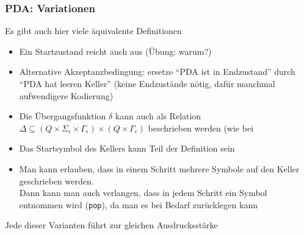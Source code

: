 \documentclass[aspectratio=1610,onlymath]{beamer}
\begin{document}
\begin{frame}\frametitle{PDA: Variationen}

Es gibt auch hier viele äquivalente Definitionen\pause
\begin{itemize}
\item Ein Startzustand reicht auch aus (Übung: warum?)\pause
\item Alternative Akzeptanzbedingung: ersetze "`PDA ist in Endzustand"' durch "`PDA hat leeren Keller"'
(keine Endzustände nötig, dafür manchmal aufwendigere Kodierung)\pause
% 
\item Die Übergangsfunktion $\delta$ kann auch als Relation $\Delta\subseteq (Q\times\Sigma_\epsilon\times\Gamma_\epsilon)\times (Q\times\Gamma_\epsilon)$ beschrieben werden (wie bei \pause
\item Das Startsymbol des Kellers kann Teil der Definition sein\pause
\item Man kann erlauben, dass in einem Schritt mehrere Symbole auf den Keller geschrieben werden.
\\ {\footnotesize \textcolor{devilscss}{Dann kann man auch verlangen, dass in jedem Schritt ein Symbol entnommen wird (\texttt{pop}), da man es bei Bedarf zurücklegen kann}}
\end{itemize}
\alert{Jede dieser Varianten führt zur gleichen Ausdrucksstärke}

\end{frame}
\end{document}
